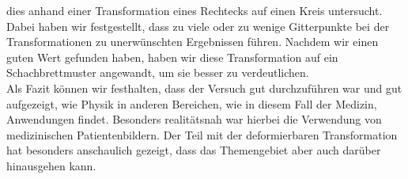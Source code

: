 dies anhand einer Transformation eines Rechtecks auf einen Kreis untersucht.
Dabei haben wir festgestellt, dass zu viele oder zu wenige Gitterpunkte bei der
Transformationen zu unerwünschten Ergebnissen führen. Nachdem wir einen guten
Wert gefunden haben, haben wir diese Transformation auf ein Schachbrettmuster
angewandt, um sie besser zu verdeutlichen.\\
Als Fazit können wir festhalten, dass der Versuch gut durchzuführen war und gut
aufgezeigt, wie Physik in anderen Bereichen, wie in diesem Fall der Medizin,
Anwendungen findet. Besonders realitätsnah war hierbei die Verwendung von
medizinischen Patientenbildern. Der Teil mit der deformierbaren Transformation
hat besonders anschaulich gezeigt, dass das Themengebiet aber auch darüber
hinausgehen kann.
